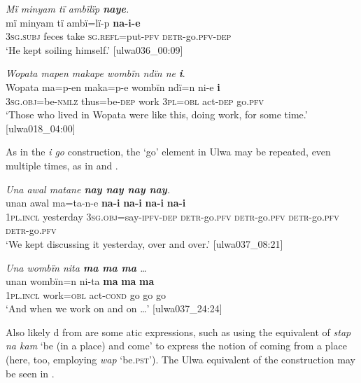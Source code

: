 \ea%
    \label{ex:loss:6}
            \textit{Mï minyam tï ambïlïp \textbf{naye}.}\\
\gll mï      minyam  tï    ambï=lï-p      \textbf{na-i-e}\\
    3\textsc{sg.subj}  feces    take  \textsc{sg.refl}=put-\textsc{pfv}  \textsc{detr}{}-go.\textsc{pfv-dep}\\
\glt `He kept soiling himself.’ [ulwa036\_00:09]
\z

\ea%
    \label{ex:loss:7}
            \textit{Wopata mapen makape wombïn ndïn ne} \textbf{\textit{i}}.\\
\gll Wopata  ma=p-en      maka=p-e    wombïn  ndï=n     ni-e    \textbf{i}\\
    [place]    3\textsc{sg.obj}=be\textsc{{}-nmlz} thus=be\textsc{{}-dep} work    3\textsc{pl=obl}    act-\textsc{dep}  go.\textsc{pfv}\\
\glt `Those who lived in Wopata were like this, doing work, for some time.’ [ulwa018\_04:00]
\z

As in the   \textit{i go} construction, the ‘go’ element in Ulwa may be repeated, even multiple times, as in  and .

\ea%
    \label{ex:loss:8}
            \textit{Una awal matane \textbf{nay nay nay nay}.}\\
\gll unan    awal    ma=ta-n-e          \textbf{na-i} \textbf{na-i}      \textbf{na-i}      \textbf{na-i}\\
    1\textsc{pl.incl}  yesterday  3\textsc{sg.obj}=say-\textsc{ipfv-dep}  \textsc{detr-}go.\textsc{pfv}    \textsc{detr}{}-go.\textsc{pfv}  \textsc{detr}{}-go.\textsc{pfv}  \textsc{detr}{}-go.\textsc{pfv}\\
\glt `We kept discussing it yesterday, over and over.’ [ulwa037\_08:21]
\z

\ea%
    \label{ex:loss:9}
            \textit{Una wombïn nita \textbf{ma ma ma} …}\\
\gll    unan    wombïn=n  ni-ta    \textbf{ma}  \textbf{ma}  \textbf{ma}\\
    1\textsc{pl.incl}  work=\textsc{obl}  act\textsc{{}-cond} go  go  go\\
\glt `And when we work on and on …’ [ulwa037\_24:24]
\z

Also likely d from  are some atic expressions, such as using the equivalent of \textit{stap na kam} ‘be (in a place) and come’ to express the notion of coming from a place (here, too, employing \textit{wap} ‘be.\textsc{pst}’). The Ulwa equivalent of the  construction may be seen in .

